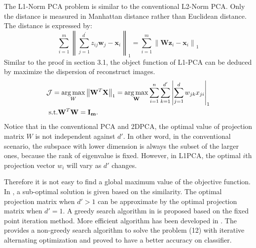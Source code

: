 \documentclass{cta-author}
\begin{document}
The L1-Norm PCA problem is similar to the conventional L2-Norm PCA. Only the distance is measured in Manhattan distance rather than Euclidean distance. The distance is expressed by:
\begin{equation}
\sum_{i=1}^m\left\|\sum_{j=1}^{d^{\prime}} z_{i j} \boldsymbol{w}_j-\boldsymbol{x}_i\right\|_1=\sum_{i=1}^m\left\|\mathbf{W} \boldsymbol{z}_i-\boldsymbol{x}_i\right\|_1
\end{equation}
Similar to the proof in section 3.1, the object function of L1-PCA can be deduced by maximize the dispersion of reconstruct images. 
\begin{equation}
\begin{aligned}
& \mathcal{J}=\underset{W}{\arg \max }\left\|\bold W^T \bold X\right\|_1=\underset{\bold W}{\arg \max } \sum_{i=1}^n \sum_{k=1}^{d'}\left|\sum_{j=1}^d w_{j k} x_{j i}\right|_1 \\
& \text { s.t.} \bold W^T \bold W=\bold{I_m} .
\end{aligned}
\end{equation}
Notice that in the conventional PCA and 2DPCA, the optimal value of projection matrix $W$ is not independent against $d'$. In other word, in the conventional scenario, the subspace with lower dimension is always the subset of the larger ones, because the rank of eigenvalue is fixed. However, in L1PCA, the optimal $i$th  projection vector $w_i$ will vary as $d'$ changes.

Therefore it is not easy to find a global maximum value of the objective function. In \cite{25}, a sub-optimal solution is given based on the similarity. The optimal projection matrix when $d'>1$ can be approximate by the optimal projection matrix when $d'=1$. A greedy search algorithm in \cite{25} is proposed based on the fixed point iteration method. More efficient algorithm has been developed in \cite{26}. The \cite{26} provides a non-greedy search algorithm to solve the problem (12) with iterative alternating optimization and proved to have a better accuracy on classifier.
\end{document}
